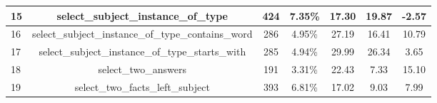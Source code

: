 \begin{table}[]
{\begin{tabular}{|l|c|cc|cc|c|}
    15                           & select\_subject\_instance\_of\_type                                                                                    & 424                                                 & 7.35\%                                                                          & 17.30                                                                                                      & 19.87                                                                                  & \textbf{-2.57}                                                                     \\ \hline
    16                           & select\_subject\_instance\_of\_type\_contains\_word                                                                    & 286                                                 & 4.95\%                                                                          & 27.19                                                                                                      & 16.41                                                                                  & 10.79                                                                              \\ \hline
    17                           & select\_subject\_instance\_of\_type\_starts\_with                                                                      & 285                                                 & 4.94\%                                                                          & 29.99                                                                                                      & 26.34                                                                                  & 3.65                                                                               \\ \hline
    18                           & select\_two\_answers                                                                                                   & 191                                                 & 3.31\%                                                                          & 22.43                                                                                                      & 7.33                                                                                   & 15.10                                                                              \\ \hline
    19                           & select\_two\_facts\_left\_subject                                                                                      & 393                                                 & 6.81\%                                                                          & 17.02                                                                                                      & 9.03                                                                                   & 7.99                                                                               \\ \hline

\end{tabular}}
\end{table}
